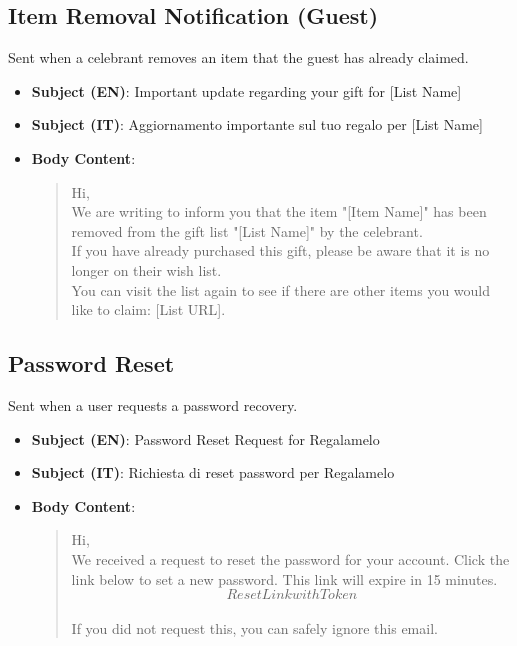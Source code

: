 \subsection{Item Removal Notification (Guest)}
Sent when a celebrant removes an item that the guest has already claimed.
\begin{itemize}
    \item \textbf{Subject (EN)}: Important update regarding your gift for [List Name]
    \item \textbf{Subject (IT)}: Aggiornamento importante sul tuo regalo per [List Name]
    \item \textbf{Body Content}:
        \begin{quote}
            Hi, \\
            We are writing to inform you that the item "[Item Name]" has been removed from the gift list "[List Name]" by the celebrant. \\
            If you have already purchased this gift, please be aware that it is no longer on their wish list. \\
            You can visit the list again to see if there are other items you would like to claim: [List URL].
        \end{quote}
\end{itemize}

\subsection{Password Reset}
Sent when a user requests a password recovery.
\begin{itemize}
    \item \textbf{Subject (EN)}: Password Reset Request for Regalamelo
    \item \textbf{Subject (IT)}: Richiesta di reset password per Regalamelo
    \item \textbf{Body Content}:
        \begin{quote}
            Hi, \\
            We received a request to reset the password for your account. Click the link below to set a new password. This link will expire in 15 minutes. \\
            \[Reset Link with Token\] \\
            If you did not request this, you can safely ignore this email.
        \end{quote}
\end{itemize}